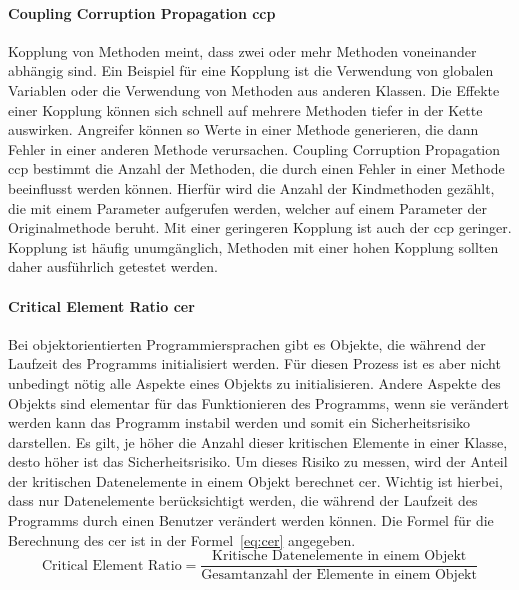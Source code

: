 \documentclass[12pt, a4paper, ngerman]{article}
\begin{document}
\paragraph{Coupling Corruption Propagation \acs{ccp}}

Kopplung von Methoden meint, dass zwei oder mehr Methoden voneinander abhängig sind.
Ein Beispiel für eine Kopplung ist die Verwendung von globalen Variablen oder 
die Verwendung von Methoden aus anderen Klassen.
Die Effekte einer Kopplung können sich schnell auf mehrere Methoden tiefer in der Kette auswirken.
Angreifer können so Werte in einer Methode generieren, die dann Fehler in einer anderen Methode verursachen.
Coupling Corruption Propagation \ac{ccp} bestimmt die Anzahl der Methoden, 
die durch einen Fehler in einer Methode beeinflusst werden können.
Hierfür wird die Anzahl der Kindmethoden gezählt, die mit einem Parameter aufgerufen werden, 
welcher auf einem Parameter der Originalmethode beruht.
Mit einer geringeren Kopplung ist auch der \ac{ccp} geringer.
Kopplung ist häufig unumgänglich, Methoden mit einer hohen Kopplung sollten daher ausführlich getestet werden.

\paragraph{Critical Element Ratio \acs{cer}}

Bei objektorientierten Programmiersprachen gibt es Objekte, 
die während der Laufzeit des Programms initialisiert werden. 
Für diesen Prozess ist es aber nicht unbedingt nötig alle Aspekte eines Objekts zu initialisieren.
Andere Aspekte des Objekts sind elementar für das Funktionieren des Programms, 
wenn sie verändert werden kann das Programm instabil werden und somit ein Sicherheitsrisiko darstellen.
Es gilt, je höher die Anzahl dieser kritischen Elemente in einer Klasse, desto höher ist das Sicherheitsrisiko.
Um dieses Risiko zu messen, wird der Anteil der kritischen Datenelemente in einem Objekt berechnet \ac{cer}.
Wichtig ist hierbei, dass nur Datenelemente berücksichtigt werden, 
die während der Laufzeit des Programms durch einen Benutzer verändert werden können.
Die Formel für die Berechnung des \ac{cer} ist in der Formel~\ref{eq:cer} angegeben.
\begin{equation} \label{eq:cer}
  \text{Critical Element Ratio} = \frac{ \text{Kritische Datenelemente in einem Objekt} }{ \text{Gesamtanzahl der Elemente in einem Objekt} }
\end{equation}
\end{document}
